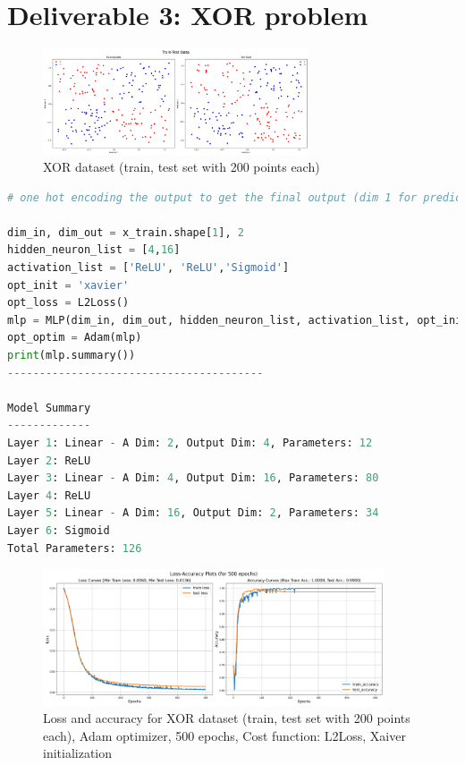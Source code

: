 
\section{Deliverable 3: XOR problem}


\begin{solve}    

\begin{figure}[H]
    \centering
    \includegraphics[width=0.7\textwidth]{plots/3_xor_dataset.png}
    \caption{XOR dataset (train, test set with 200 points each)}
\end{figure}

\begin{lstlisting}[language=python]
# one hot encoding the output to get the final output (dim 1 for prediction)

dim_in, dim_out = x_train.shape[1], 2
hidden_neuron_list = [4,16]
activation_list = ['ReLU', 'ReLU','Sigmoid']
opt_init = 'xavier'
opt_loss = L2Loss()
mlp = MLP(dim_in, dim_out, hidden_neuron_list, activation_list, opt_init)
opt_optim = Adam(mlp)
print(mlp.summary())
----------------------------------------

Model Summary
-------------
Layer 1: Linear - A Dim: 2, Output Dim: 4, Parameters: 12
Layer 2: ReLU
Layer 3: Linear - A Dim: 4, Output Dim: 16, Parameters: 80
Layer 4: ReLU
Layer 5: Linear - A Dim: 16, Output Dim: 2, Parameters: 34
Layer 6: Sigmoid
Total Parameters: 126
\end{lstlisting}

\begin{figure}[H]
    \centering
    \includegraphics[width=0.9\textwidth]{plots/3_xor_adam_loss_acc.png}
    \caption{Loss and accuracy for XOR dataset (train, test set with 200 points each), Adam optimizer, 500 epochs, Cost function: L2Loss, Xaiver initialization}
\end{figure}


\end{solve}
